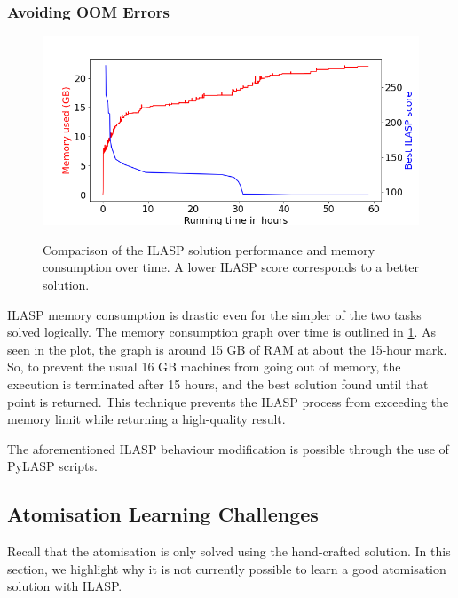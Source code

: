 \subsubsection{Avoiding OOM Errors}
\label{avoiding-oom-errors}

\begin{figure}[h]
\caption{Comparison of the ILASP solution performance and memory consumption over time. A lower ILASP score corresponds to a better solution.}
\centering
\includegraphics[width=\textwidth]{solving-nlp-tasks-logically/generalisation_memory_vs_best_score.png}
\label{generalisation-memory-graph}
\end{figure}

ILASP memory consumption is drastic even for the simpler of the two tasks solved logically.
The memory consumption graph over time is outlined in \ref{generalisation-memory-graph}.
As seen in the plot, the graph is around 15 GB of RAM at about the 15-hour mark.
So, to prevent the usual 16 GB machines from going out of memory, the execution is terminated after 15 hours, and the best solution found until that point is returned.
This technique prevents the ILASP process from exceeding the memory limit while returning a high-quality result.

The aforementioned ILASP behaviour modification is possible through the use of PyLASP scripts.

\subsection{Atomisation Learning Challenges}
\label{atomisation-learning-challenges}

Recall that the atomisation is only solved using the hand-crafted solution. 
In this section, we highlight why it is not currently possible to learn a good atomisation solution with ILASP.


